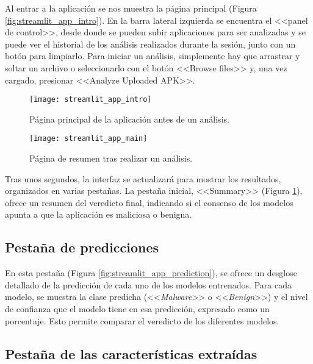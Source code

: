 Al entrar a la aplicación se nos muestra la página principal (Figura \ref{fig:streamlit_app_intro}). En la barra lateral izquierda se encuentra el <<panel de control>>, desde donde se pueden subir aplicaciones para ser analizadas y se puede ver el historial de los análisis realizados durante la sesión, junto con un botón para limpiarlo. Para iniciar un análisis, simplemente hay que arrastrar y soltar un archivo o seleccionarlo con el botón <<Browse files>> y, una vez cargado, presionar <<Analyze Uploaded APK>>.

\begin{figure}[h!]
	\centering
	\begin{minipage}[t]{0.45\textwidth}
		\centering
		\texttt{[image: streamlit\_app\_intro]}
		\caption{Página principal de la aplicación antes de un análisis.}
		\label{fig:streamlit_app_intro}
	\end{minipage}\hfill
	\begin{minipage}[t]{0.45\textwidth}
		\centering
		\texttt{[image: streamlit\_app\_main]}
		\caption{Página de resumen tras realizar un análisis.}
		\label{fig:streamlit_app_main}
	\end{minipage}
\end{figure}

Tras unos segundos, la interfaz se actualizará para mostrar los resultados, organizados en varias pestañas. La pestaña inicial, <<Summary>> (Figura \ref{fig:streamlit_app_main}), ofrece un resumen del veredicto final, indicando si el consenso de los modelos apunta a que la aplicación es maliciosa o benigna.

\newpage
\subsection{Pestaña de predicciones}

En esta pestaña (Figura \ref{fig:streamlit_app_prediction}), se ofrece un desglose detallado de la predicción de cada uno de los modelos entrenados. Para cada modelo, se muestra la clase predicha (<<\textit{Malware}>> o <<\textit{Benign}>>) y el nivel de confianza que el modelo tiene en esa predicción, expresado como un porcentaje. Esto permite comparar el veredicto de los diferentes modelos.


\subsection{Pestaña de las características extraídas}

